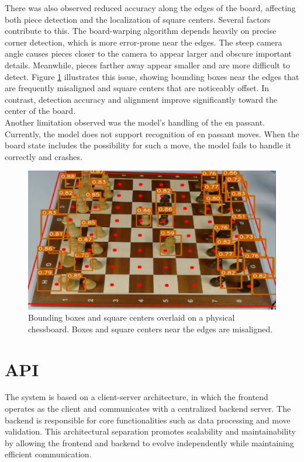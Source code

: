 There was also observed reduced accuracy along the edges of the board, affecting both piece detection and the localization of square centers. Several factors contribute to this. The board-warping algorithm depends heavily on precise corner detection, which is more error-prone near the edges. The steep camera angle causes pieces closer to the camera to appear larger and obscure important details. Meanwhile, pieces farther away appear smaller and are more difficult to detect. Figure \ref{fig:bbox-centers-incorrect} illustrates this issue, showing bounding boxes near the edges that are frequently misaligned and square centers that are noticeably offset. In contrast, detection accuracy and alignment improve significantly toward the center of the board. \\

Another limitation observed was the model's handling of the en passant. Currently, the model does not support recognition of en passant moves. When the board state includes the possibility for such a move, the model fails to handle it correctly and crashes.


\begin{figure}[h!]
    \centering
    \includegraphics[width=0.75\linewidth]{figures/discussion/bbox-centers-incorrect.png}
    \caption[Bounding box and square center misalignment]{Bounding boxes and square centers overlaid on a physical chessboard. Boxes and square centers near the edges are misaligned.}
    \label{fig:bbox-centers-incorrect}
\end{figure}


\section{API}
The system is based on a client-server architecture, in which the frontend operates as the client and communicates with a centralized backend server. The backend is responsible for core functionalities such as data processing and move validation. This architectural separation promotes scalability and maintainability by allowing the frontend and backend to evolve independently while maintaining efficient communication. \\

